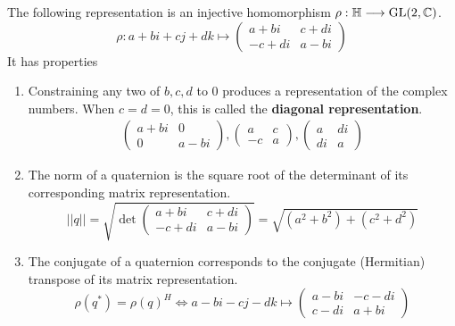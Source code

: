       \begin{proposition}
        The following representation is an injective homomorphism $\rho: \mathbb{H} \longrightarrow \operatorname{GL}(2, \mathbb{C})$. 
        \begin{equation}
          \rho: a + bi + cj + dk \mapsto \begin{pmatrix}
          a+bi & c+ di \\ -c + di & a - bi
          \end{pmatrix}
        \end{equation}
        It has properties
        \begin{enumerate}
          \item Constraining any two of $b, c, d$ to $0$ produces a representation of the complex numbers. When $c = d = 0$, this is called the \textbf{diagonal representation}. 
          \begin{align*}
            \begin{pmatrix}
            a+bi & 0 \\ 0 & a-bi
            \end{pmatrix},  \begin{pmatrix}
            a & c \\ -c & a
            \end{pmatrix},  \begin{pmatrix}
            a & di \\ di & a
            \end{pmatrix}
          \end{align*}
          \item The norm of a quaternion is the square root of the determinant of its corresponding matrix representation. 
            \begin{equation}
              ||q|| = \sqrt{\det \begin{pmatrix}
              a+bi & c+di \\ -c+di & a-bi
              \end{pmatrix}} = \sqrt{(a^2 + b^2) + (c^2 + d^2)}
            \end{equation}
          \item The conjugate of a quaternion corresponds to the conjugate (Hermitian) transpose of its matrix representation. 
            \begin{equation}
              \rho(q^*) = \rho(q)^H \iff a-bi-cj-dk \mapsto \begin{pmatrix}
              a-bi & -c-di \\ c-di & a+bi

\end{pmatrix}
\end{equation}
\end{enumerate}
\end{proposition}

